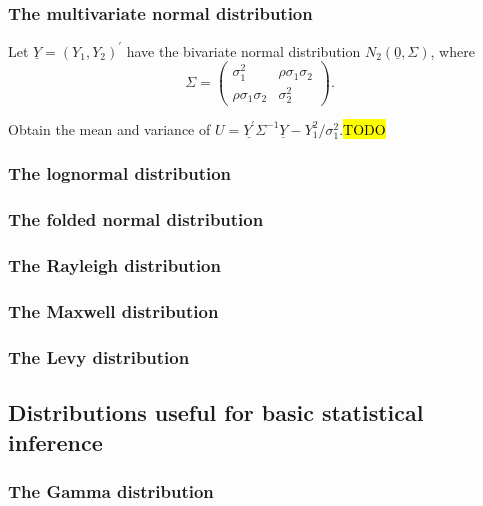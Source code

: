 \subsubsection{The multivariate normal distribution}
\begin{example}
\label{exa:isi2008samplepsb8}Let $\underline{Y}=\left(Y_{1},Y_{2}\right)^{\prime}$
have the bivariate normal distribution $N_{2}(\underline{0},\Sigma)$,
where 
\[
\Sigma=\left(\begin{array}{cc}
\sigma_{1}^{2} & \rho\sigma_{1}\sigma_{2}\\
\rho\sigma_{1}\sigma_{2} & \sigma_{2}^{2}
\end{array}\right).
\]

Obtain the mean and variance of $U=\underline{Y^{\prime}}\Sigma^{-1}\underline{Y}-Y_{1}^{2}/\sigma_{1}^{2}$.\hl{TODO}
\end{example}


\subsubsection{The lognormal distribution}

\subsubsection{The folded normal distribution}

\subsubsection{The Rayleigh distribution}

\subsubsection{The Maxwell distribution}

\subsubsection{The Levy distribution}

\subsection{Distributions useful for basic statistical inference}

\subsubsection{The Gamma distribution}

